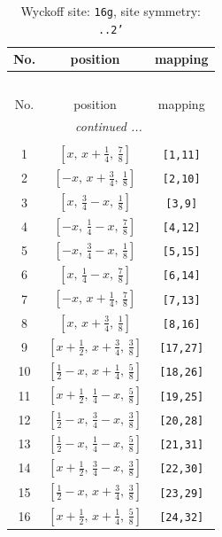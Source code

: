 \documentclass[fleqn,8pt]{jsarticle}
\begin{document}
\renewcommand{\arraystretch}{1.2}
\begin{longtable}{ccc}
\caption{Wyckoff site: {\tt 16g}, site symmetry: {\tt ..2'}}
 \\
 \hline \hline
No. & position & mapping \\ \hline \endfirsthead

\multicolumn{2}{l}{\tablename\ \thetable{}} \\
 \hline \hline
No. & position & mapping \\ \hline \endhead

 \hline \hline
\multicolumn{2}{r}{\footnotesize\it continued ...} \\ \endfoot

 \hline \hline
\multicolumn{2}{r}{} \\ \endlastfoot

1 & $\left[ x,\, x + \frac{1}{4},\, \frac{7}{8} \right]$ & {\tt [1,11]} \\ \hline
2 & $\left[ - x,\, x + \frac{3}{4},\, \frac{1}{8} \right]$ & {\tt [2,10]} \\ \hline
3 & $\left[ x,\, \frac{3}{4} - x,\, \frac{1}{8} \right]$ & {\tt [3,9]} \\ \hline
4 & $\left[ - x,\, \frac{1}{4} - x,\, \frac{7}{8} \right]$ & {\tt [4,12]} \\ \hline
5 & $\left[ - x,\, \frac{3}{4} - x,\, \frac{1}{8} \right]$ & {\tt [5,15]} \\ \hline
6 & $\left[ x,\, \frac{1}{4} - x,\, \frac{7}{8} \right]$ & {\tt [6,14]} \\ \hline
7 & $\left[ - x,\, x + \frac{1}{4},\, \frac{7}{8} \right]$ & {\tt [7,13]} \\ \hline
8 & $\left[ x,\, x + \frac{3}{4},\, \frac{1}{8} \right]$ & {\tt [8,16]} \\ \hline
9 & $\left[ x + \frac{1}{2},\, x + \frac{3}{4},\, \frac{3}{8} \right]$ & {\tt [17,27]} \\ \hline
10 & $\left[ \frac{1}{2} - x,\, x + \frac{1}{4},\, \frac{5}{8} \right]$ & {\tt [18,26]} \\ \hline
11 & $\left[ x + \frac{1}{2},\, \frac{1}{4} - x,\, \frac{5}{8} \right]$ & {\tt [19,25]} \\ \hline
12 & $\left[ \frac{1}{2} - x,\, \frac{3}{4} - x,\, \frac{3}{8} \right]$ & {\tt [20,28]} \\ \hline
13 & $\left[ \frac{1}{2} - x,\, \frac{1}{4} - x,\, \frac{5}{8} \right]$ & {\tt [21,31]} \\ \hline
14 & $\left[ x + \frac{1}{2},\, \frac{3}{4} - x,\, \frac{3}{8} \right]$ & {\tt [22,30]} \\ \hline
15 & $\left[ \frac{1}{2} - x,\, x + \frac{3}{4},\, \frac{3}{8} \right]$ & {\tt [23,29]} \\ \hline
16 & $\left[ x + \frac{1}{2},\, x + \frac{1}{4},\, \frac{5}{8} \right]$ & {\tt [24,32]} \\
\end{longtable}
\end{document}
